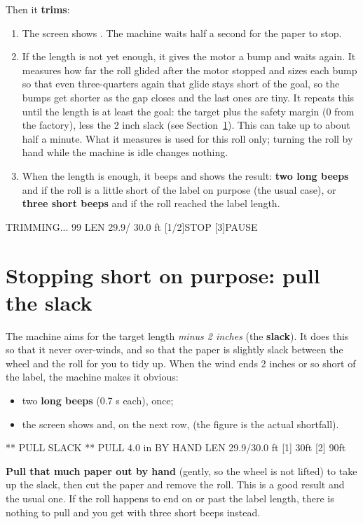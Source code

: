 Then it \textbf{trims}:
\begin{enumerate}
  \item The screen shows . The machine waits half a second
        for the paper to stop.
  \item If the length is not yet enough, it gives the motor a bump and
        waits again. It measures how far the roll glided after the motor
        stopped and sizes each bump so that even three-quarters again that glide stays
        short of the goal, so the bumps get shorter as the gap closes and the
        last ones are tiny. It repeats this until the length is at least the
        goal: the target plus the safety margin (0 from the factory), less the 2 inch
        slack (see Section~\ref{sec:slack}). This can
        take up to about half a minute. What it measures is used for this
        roll only; turning the roll by hand while the machine is idle
        changes nothing.
  \item When the length is enough, it beeps and shows the result:
        \textbf{two long beeps} and  if the roll is a
        little short of the label on purpose (the usual case),
        or \textbf{three short beeps} and  if the roll reached
        the label length.
\end{enumerate}

\begin{lcd}
     TRIMMING...
 99%
LEN   29.9/  30.0 ft
[1/2]STOP   [3]PAUSE
\end{lcd}

\section{Stopping short on purpose: pull the slack}\label{sec:slack}
The machine aims for the target length \emph{minus 2 inches} (the
\textbf{slack}). It does this so that it never over-winds, and so that the
paper is slightly slack between the wheel and the roll for you to tidy up.
When the wind ends 2 inches or so short of the label, the machine makes it
obvious:
\begin{itemize}
  \item two \textbf{long beeps} (0.7 s each), once;
  \item the screen shows  and, on the next row,
         (the figure is the actual shortfall).
\end{itemize}
\begin{lcd}
  ** PULL SLACK **
PULL 4.0 in BY HAND
LEN 29.9/30.0 ft
[1] 30ft    [2] 90ft
\end{lcd}
\textbf{Pull that much paper out by hand} (gently, so the wheel is not
lifted) to take up the slack, then cut the paper and remove the roll. This is
a good result and the usual one. If the roll happens to end on or past the
label length, there is nothing to pull and you get  with three
short beeps instead.

